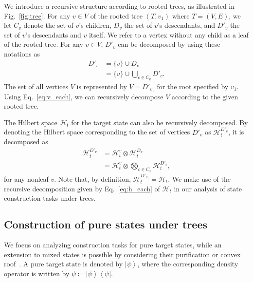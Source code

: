 \documentclass[preprintnumbers,aps,amsmath,amssymb,pra,twocolumn,showpacs,superscriptaddress,floatfix]{revtex4-1}
\def\Bra#1{\left\langle#1\right|}
\def\Ket#1{\left|#1\right\rangle}
\theoremstyle{plain}
\theoremstyle{definition}
\theoremstyle{remark}
\begin{document}
We introduce a recursive structure according to rooted trees, as illustrated in Fig.~\ref{fig:tree}.
For any $v\in V$ of the rooted tree $(T,v_1)$ where $T=(V,E)$, we let $C_v$ denote the set of $v$'s children, $D_{v}$ the set of $v$'s descendants, and $D'_v$ the set of $v$'s descendants and $v$ itself.
We refer to a vertex without any child as a leaf of the rooted tree.
For any $v\in V$, $D'_v$ can be decomposed by using these notations as
\begin{equation}
    \label{eq:v_each}
    \begin{split}
        D'_v &= \{v\}\cup D_v\\
        &=\{v\}\cup \bigcup_{c\in C_v} D'_c.
    \end{split}
\end{equation}
The set of all vertices $V$ is represented by $V=D'_{v_1}$ for the root specified by $v_1$.  Using Eq.~\eqref{eq:v_each}, we can recursively decompose $V$ according to the given rooted tree.

The Hilbert space $\mathcal{H}_t$ for the target state can also be recursively decomposed.   By denoting the Hilbert space corresponding to the set of vertices $D'_v$ as $\mathcal{H}_t^{D'_v}$,  it is decomposed as 
\begin{equation}
    \label{eq:h_each}
    \begin{split}
        \mathcal{H}_t^{D'_v} &= \mathcal{H}_t^v\otimes\mathcal{H}_t^{D_v}\\
        &=\mathcal{H}_t^{v}\otimes\bigotimes_{c\in C_v}\mathcal{H}_t^{D'_c},
    \end{split}
\end{equation}
for any nonleaf $v$.   Note that, by definition, $\mathcal{H}_t^{D'_{v_1}}=\mathcal{H}_t$.  We make use of the recursive decomposition given by Eq.~\eqref{eq:h_each} of $\mathcal{H}_t$ in our analysis of state construction tasks under trees.


\subsection{Construction of pure states under trees}
We focus on analyzing construction tasks for pure target states, while an extension to mixed states is possible by considering their purification or convex roof~\cite{RefWorks:111}.
A pure target state is denoted by $\Ket{\psi}$, where the corresponding density operator is written by $\psi \coloneqq \Ket{\psi}\Bra{\psi}$.
\end{document}
